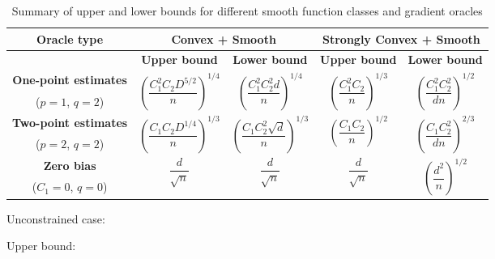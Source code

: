 \begin{table*}
\centering
 \caption{Summary of upper and lower bounds for different smooth function classes and  gradient oracles}
\label{tab:mse-1}
 \begin{tabular}{|c|c|c|c|c|}
\toprule
  \multirow{2}{*}{\textbf{Oracle type}} & \multicolumn{2}{c}{\multirow{2}{*}{\textbf{Convex + Smooth}}} & \multicolumn{2}{|c|}{\multirow{2}{*}{\textbf{Strongly Convex + Smooth}}} \\[1em]
 \midrule
 & \textbf{Upper bound} & \textbf{Lower bound} & \textbf{Upper bound} & \textbf{Lower bound}\\
 \midrule
\textbf{ One-point estimates} & \multirow{2}{*}{$\left(\dfrac{C_1^{2}C_2 D^{5/2}}{n}\right)^{1/4}$}  & \multirow{2}{*}{$\left(\dfrac{C_1^2 C_2^2 d}{n}\right)^{1/4}$}& \multirow{2}{*}{$\left(\dfrac{C_1^2 C_2}{n}\right)^{1/3}$}  & \multirow{2}{*}{$\left(\dfrac{C_1^2 C_2^2}{d n}\right)^{1/2}$} \\[0.5ex]
 ($p=1$, $q=2$) & & & &\\\midrule
\textbf{ Two-point estimates} & \multirow{2}{*}{$\left(\dfrac{C_1 C_2 D^{1/4}}{n}\right)^{1/3}$}  & \multirow{2}{*}{$\left(\dfrac{C_1 C_2^2 \sqrt d}{n}\right)^{1/3}$} & \multirow{2}{*}{$\left(\dfrac{C_1 C_2}{n}\right)^{1/2}$}  & \multirow{2}{*}{$\left(\dfrac{C_1 C_2^2 }{d n}\right)^{2/3}$}\\[1.4ex]
 ($p=2$, $q=2$) & & & &\\
  \midrule
 \textbf{Zero bias} & \multirow{2}{*}{$\dfrac{d}{\sqrt{n}}$}  & \multirow{2}{*}{$\dfrac{d}{\sqrt{n}}$} & \multirow{2}{*}{$\dfrac{d}{\sqrt{n}}$}  & \multirow{2}{*}{$\left(\dfrac{d^2}{n}\right)^{1/2}$}  \\[0.5ex]
 ($C_1=0$, $q=0$) & & & &\\\bottomrule
\end{tabular}
\end{table*}

Unconstrained case:

Upper bound: 

